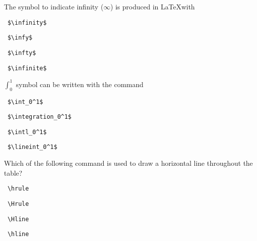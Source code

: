\documentclass{exam}
\begin{document}
\begin{questions}
\question The symbol to indicate infinity ($\infty$) is produced in \LaTeX with %
\begin{multicols}{2}
	\begin{choices}
		\choice \begin{verbatim} $\infinity$ \end{verbatim}
		\choice \begin{verbatim} $\infy$ \end{verbatim}
		\choice \begin{verbatim} $\infty$ \end{verbatim}
		\choice \begin{verbatim} $\infinite$ \end{verbatim}
	\end{choices}
\end{multicols}

\question $\int_0^1$ symbol can be written with the command %
\begin{multicols}{2}
	\begin{choices}
		\choice \begin{verbatim} $\int_0^1$ \end{verbatim}
		\choice \begin{verbatim} $\integration_0^1$ \end{verbatim}
		\choice \begin{verbatim} $\intl_0^1$ \end{verbatim}
		\choice \begin{verbatim} $\lineint_0^1$ \end{verbatim}
	\end{choices}
\end{multicols}

\question Which of the following command is used to draw a horizontal line throughout the table? %
\begin{multicols}{2}
	\begin{choices}
		\choice \begin{verbatim} \hrule \end{verbatim}
		\choice \begin{verbatim} \Hrule \end{verbatim}
		\choice \begin{verbatim} \Hline \end{verbatim}
		\choice \begin{verbatim} \hline \end{verbatim}
	\end{choices}
\end{multicols}


\end{questions}
\end{document}
